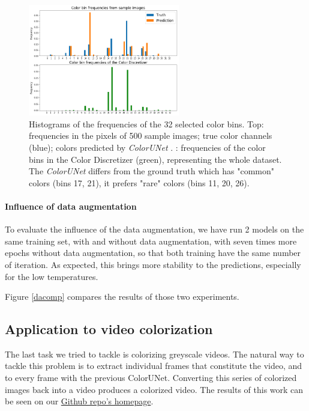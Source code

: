 \documentclass[10pt,twocolumn,letterpaper]{article}
\begin{document}
\begin{figure}
\begin{center}
\includegraphics[width=250px]{color_histogram}
\caption{Histograms of the frequencies of the 32 selected color bins. Top: frequencies in the pixels of 500 sample images; true color channels (blue); colors predicted by \textit{ColorUNet} . : frequencies of the color bins in the Color Discretizer (green), representing the whole dataset. The \textit{ColorUNet} differs from the ground truth which has "common" colors (bins 17, 21), it prefers "rare" colors (bins 11, 20, 26). }
\label{histogram}
\end{center}
\end{figure}


\paragraph{Influence of data augmentation}

To evaluate the influence of the data augmentation, we have run 2 models on the same training set, with and without data augmentation, with seven times more epochs without data augmentation, so that both training have the same number of iteration. As expected, this brings more stability to the predictions, especially for the low temperatures. 

Figure \ref{dacomp} compares the results of those two experiments. 

\subsection{Application to video colorization}

The last task we tried to tackle is colorizing greyscale videos. The natural way to tackle this problem is to extract individual frames that constitute the video, and to every frame with the previous ColorUNet. Converting this series of colorized images back into a video produces a colorized video. The results of this work can be seen on our \href{https://github.com/vincentbillaut/all-colors-matter}{Github repo's homepage}.
\end{document}
